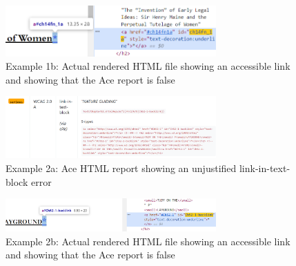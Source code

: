 \begin{appendices}
\begin{figure}[h]
\includegraphics[width=0.72\textwidth,keepaspectratio]{media/images/ace-wrongv2.png}
\caption{Example 1b: Actual rendered HTML file showing an accessible link and showing that the Ace report is false}
\centering
\label{figure:Appendix_ace-wrong_code}
\end{figure}

\begin{figure}[h]
\includegraphics[width=0.72\textwidth,keepaspectratio]{media/images/again-ace-wrong.png}
\caption{Example 2a: Ace HTML report showing an unjustified link-in-text-block error}
\centering
\label{figure:Appendix_ace-wrong2}
\end{figure}

\begin{figure}[h]
\includegraphics[width=0.72\textwidth,keepaspectratio]{media/images/again-ace-wrongv2.png}
\caption{Example 2b: Actual rendered HTML file showing an accessible link and showing that the Ace report is false}
\centering
\label{figure:Appendix_ace-wrong2_code}
\end{figure}

\end{appendices}